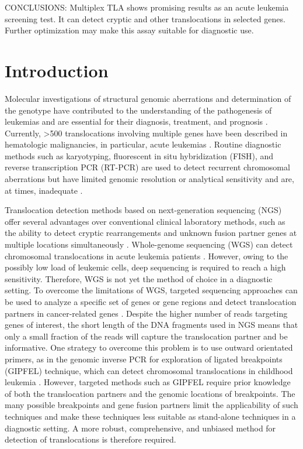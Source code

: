\noindent CONCLUSIONS: Multiplex TLA shows promising results as an acute leukemia screening test. 
It can detect cryptic and other translocations in selected genes. 
Further optimization may make this assay suitable for diagnostic use.  

\section{Introduction}\label{introduction}
Molecular investigations of structural genomic aberrations and determination of the genotype have contributed to the understanding of the pathogenesis of leukemias and are essential for their diagnosis, treatment, and prognosis \cite{Shaffer_2012}.
Currently, \textgreater 500 translocations involving multiple genes have been described in hematologic malignancies, in particular, acute leukemias \cite{Mitelman_2017}. 
Routine diagnostic methods such as karyotyping, fluorescent in situ hybridization (FISH), and reverse transcription PCR (RT-PCR) are used to detect recurrent chromosomal aberrations but have limited genomic resolution or analytical sensitivity and are, at times, inadequate \cite{Sandberg_2010}.

Translocation detection methods based on next-generation sequencing (NGS) offer several advantages over conventional clinical laboratory methods, such as the ability to detect cryptic rearrangements and unknown fusion partner genes at multiple locations simultaneously \cite{Mertens_2015}.
Whole-genome sequencing (WGS) can detect chromosomal translocations in acute leukemia patients \cite{Welch_2011}. 
However, owing to the possibly low load of leukemic cells, deep sequencing is required to reach a high sensitivity.
Therefore, WGS is not yet the method of choice in a diagnostic setting. 
To overcome the limitations of WGS, targeted sequencing approaches can be used to analyze a specific set of genes or gene regions and detect translocation partners in cancer-related genes \cite{Duncavage_2012}.
Despite the higher number of reads targeting genes of interest, the short length of the DNA fragments used in NGS means that only a small fraction of the reads will capture the translocation partner and be informative.
One strategy to overcome this problem is to use outward orientated primers, as in the genomic inverse PCR for exploration of ligated breakpoints (GIPFEL) technique, which can detect chromosomal translocations in childhood leukemia \cite{Fueller_2014}.
However, targeted methods such as GIPFEL require prior knowledge of both the translocation partners and the genomic locations of breakpoints. 
The many possible breakpoints and gene fusion partners limit the applicability of such techniques and make these techniques less suitable as stand-alone techniques in a diagnostic setting. 
A more robust, comprehensive, and unbiased method for detection of translocations is therefore required. 

